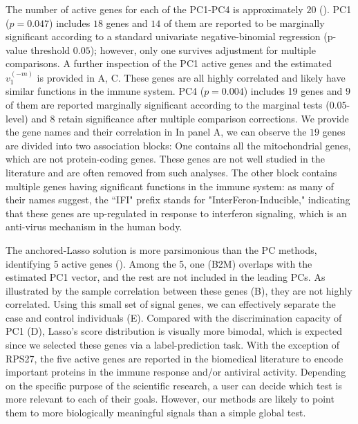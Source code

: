 \documentclass[11pt]{article}
\begin{document}
The number of active genes for each of the PC1-PC4 is approximately $20$ (). PC1 ($p=0.047$) includes $18$ genes and $14$ of them are reported to be marginally significant according to a standard univariate negative-binomial regression (p-value threshold $0.05$); however, only one survives adjustment for multiple comparisons. A further inspection of the PC1 active genes and the estimated $v_1^{(-m)}$ is provided in  A, C. These genes are all highly correlated and likely have similar functions in the immune system. PC4 ($p=0.004$) includes 19 genes and $9$ of them are reported marginally significant according to the marginal tests ($0.05$-level) and 8 retain significance after multiple comparison corrections. We provide the gene names and their correlation in   In panel A, we can observe the $19$ genes are divided into two association blocks: One contains all the mitochondrial genes, which are not protein-coding genes.  These genes are not well studied in the literature and are often removed from such analyses. The other block contains multiple genes having significant functions in the immune system: as many of their names suggest, the ``IFI" prefix stands for "InterFeron-Inducible," indicating that these genes are up-regulated in response to interferon signaling, which is an anti-virus mechanism in the human body.

The anchored-Lasso solution is more parsimonious than the PC methods, identifying 5 active genes (). Among the 5, one (B2M) overlaps with the estimated PC1 vector, and the rest are not included in the leading PCs. As illustrated by the sample correlation between these genes (B), they are not highly correlated. Using this small set of signal genes, we can effectively separate the case and control individuals (E). Compared with the discrimination capacity of PC1 (D), Lasso's score distribution is visually more bimodal, which is expected since we selected these genes via a label-prediction task. With the exception of RPS27, the five active genes are reported in the biomedical literature to encode important proteins in the immune response and/or antiviral activity\cite{creus2012multifaceted,tang2021impact, largent2023dysregulated, takeuchi2019genome}. Depending on the specific purpose of the scientific research, a user can decide which test is more relevant to each of their goals. However, our methods are likely to point them to more biologically meaningful signals than a simple global test.
\end{document}
